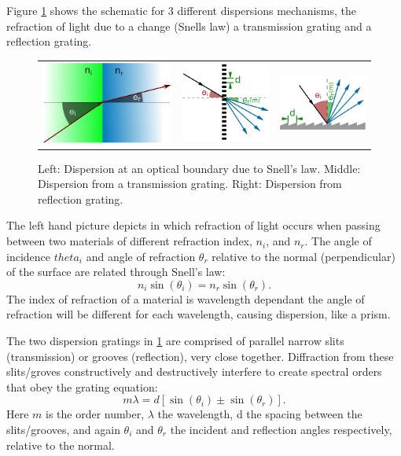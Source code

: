 Figure \cref{fig:dispersion_elements} shows the schematic for 3 different dispersions mechanisms, the refraction of light due to a change (Snells law) a transmission grating and a reflection grating.
\begin{figure}
    \centering
    \begin{tabular}{ccc}
   \includegraphics[width=0.3\linewidth]{figures/spectroscopy/snells_law} & \includegraphics[width=0.2\linewidth]{figures/spectroscopy/dispersion_grism-transmission} & \includegraphics[width=0.3\linewidth]{figures/spectroscopy/dispersion_grism-reflection} \\
\end{tabular}
    \caption{Left: Dispersion at an optical boundary due to Snell's law.
        Middle: Dispersion from a transmission grating.
        Right: Dispersion from reflection grating.}
    \label{fig:dispersion_elements}
\end{figure}
The left hand picture depicts in which refraction of light occurs when passing between two materials of different refraction index, $n_{i}$, and $n_{r}$.
The angle of incidence $theta_{i}$ and angle of refraction $\theta_{r}$ relative to the normal (perpendicular) of the surface are related through Snell's law:
\[n_{i} \sin(\theta_{i}) = n_{r} \sin(\theta_{r}).\]
The index of refraction of a material is wavelength dependant the angle of refraction will be different for each wavelength, causing dispersion, like a prism.

The two dispersion gratings in \cref{fig:dispersion_elements} are comprised of parallel narrow slits (transmission) or grooves (reflection), very close together.
Diffraction from these slits/groves constructively and destructively interfere to create spectral orders that obey the grating equation:
\begin{equation}
m \lambda = d [\sin(\theta_{i}) \pm \sin(\theta_{r})].
\end{equation}
Here $m$ is the order number, $\lambda$ the wavelength, d the spacing between the slits/grooves, and again $\theta_{i}$ and $\theta_{r}$ the incident and reflection angles respectively, relative to the normal.

